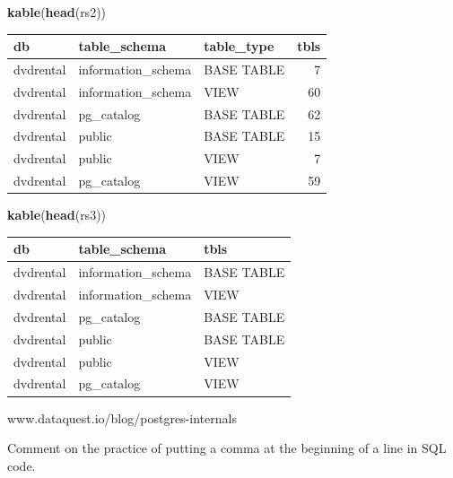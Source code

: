 \documentclass[]{book}
\newenvironment{Shaded}{\begin{snugshade}}{\end{snugshade}}
\newcommand{\KeywordTok}[1]{\textcolor[rgb]{0.13,0.29,0.53}{\textbf{#1}}}
\newcommand{\NormalTok}[1]{#1}
\theoremstyle{definition}
\theoremstyle{definition}
\theoremstyle{definition}
\theoremstyle{remark}
\begin{document}
\begin{Shaded}
\begin{Highlighting}[]
\KeywordTok{kable}\NormalTok{(}\KeywordTok{head}\NormalTok{(rs2))}
\end{Highlighting}
\end{Shaded}

\begin{tabular}{l|l|l|r}
\hline
db & table\_schema & table\_type & tbls\\
\hline
dvdrental & information\_schema & BASE TABLE & 7\\
\hline
dvdrental & information\_schema & VIEW & 60\\
\hline
dvdrental & pg\_catalog & BASE TABLE & 62\\
\hline
dvdrental & public & BASE TABLE & 15\\
\hline
dvdrental & public & VIEW & 7\\
\hline
dvdrental & pg\_catalog & VIEW & 59\\
\hline
\end{tabular}

\begin{Shaded}
\begin{Highlighting}[]
\KeywordTok{kable}\NormalTok{(}\KeywordTok{head}\NormalTok{(rs3))}
\end{Highlighting}
\end{Shaded}

\begin{tabular}{l|l|l}
\hline
db & table\_schema & tbls\\
\hline
dvdrental & information\_schema & BASE TABLE\\
\hline
dvdrental & information\_schema & VIEW\\
\hline
dvdrental & pg\_catalog & BASE TABLE\\
\hline
dvdrental & public & BASE TABLE\\
\hline
dvdrental & public & VIEW\\
\hline
dvdrental & pg\_catalog & VIEW\\
\hline
\end{tabular}

www.dataquest.io/blog/postgres-internals

Comment on the practice of putting a comma at the beginning of a line in
SQL code.
\end{document}
